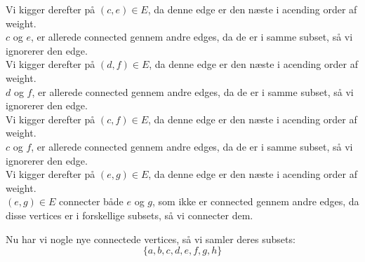 \documentclass[a4paper,12pt]{article}
\begin{document}
Vi kigger derefter på $(c,e)\in E$, da denne edge er den næste i acending order af weight.\\
$c$ og $e$, er allerede connected gennem andre edges, da de er i samme subset, så vi ignorerer den edge.\\
Vi kigger derefter på $(d,f)\in E$, da denne edge er den næste i acending order af weight.\\
$d$ og $f$, er allerede connected gennem andre edges, da de er i samme subset, så vi ignorerer den edge.\\
Vi kigger derefter på $(c,f)\in E$, da denne edge er den næste i acending order af weight.\\
$c$ og $f$, er allerede connected gennem andre edges, da de er i samme subset, så vi ignorerer den edge.\\
Vi kigger derefter på $(e,g)\in E$, da denne edge er den næste i acending order af weight.\\
$(e,g)\in E$ connecter både $e$ og $g$, som ikke er connected gennem andre edges, da disse vertices er i forskellige subsets, så vi connecter dem.
\begin{figure}[H]
    \centering
    \caption*{}
\end{figure}
Nu har vi nogle nye connectede vertices, så vi samler deres subsets:
\[\{a,b,c,d,e,f,g,h\}\]
\end{document}

